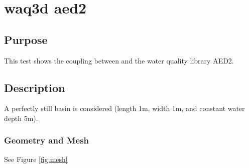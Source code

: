 
\chapter{waq3d aed2}
%
%
\section{Purpose}
%
This test shows the coupling between  and the water quality library AED2.
%
\section{Description}
%
A perfectly still basin is considered (length 1m, width 1m, and constant water depth 5m).


%
%
%
%
%
%
%
\subsection{Geometry and Mesh}
%
See Figure \ref{fig:mesh}

